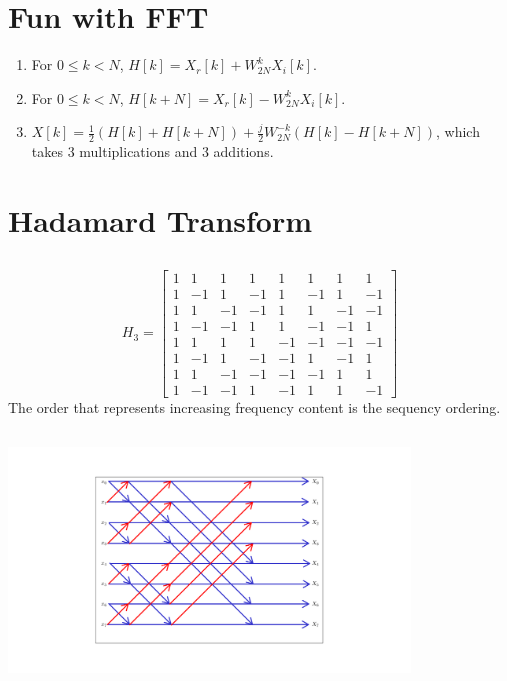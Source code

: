 \documentclass{article}
\begin{document}
\newpage
\section{Fun with FFT}

\begin{enumerate}
    \item For \(0 \leqslant k < N\), \(H[k] = X_r[k] + W_{2N}^k X_i[k]\).
    \item For \(0 \leqslant k < N\), \(H[k + N] = X_r[k] - W_{2N}^k X_i[k]\).
    \item \(X[k] = \frac{1}{2} (H[k] + H[k + N]) + \frac{j}{2} W_{2N}^{-k} (H[k] - H[k + N])\), which takes 3 multiplications and 3 additions.
\end{enumerate}

\newpage
\section{Hadamard Transform}

\subsection{}

\begin{equation}
    H_3 =
    \begin{bmatrix}
        1 & 1 & 1 & 1 & 1 & 1 & 1 & 1 \\
        1 & -1 & 1 & -1 & 1 & -1 & 1 & -1 \\
        1 & 1 & -1 & -1 & 1 & 1 & -1 & -1 \\
        1 & -1 & -1 & 1 & 1 & -1 & -1 & 1 \\
        1 & 1 & 1 & 1 & -1 & -1 & -1 & -1 \\
        1 & -1 & 1 & -1 & -1 & 1 & -1 & 1 \\
        1 & 1 & -1 & -1 & -1 & -1 & 1 & 1 \\
        1 & -1 & -1 & 1 & -1 & 1 & 1 & -1
    \end{bmatrix}
\end{equation}
The order that represents increasing frequency content is the sequency ordering.

\subsection{}

\begin{center}
    \includegraphics[width=0.8\textwidth]{q5b.png}
\end{center}
\end{document}
